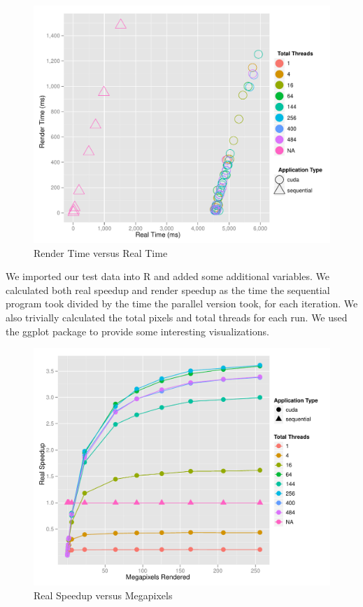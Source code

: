 \documentclass[12pt]{article}
\begin{document}
\begin{figure}
    \caption{Render Time versus Real Time} \label{fig:render_vs_real}
    \begin{center}
\includegraphics{cudatrace-003}
    \end{center}
\end{figure}

We imported our test data into R and added some additional variables. We calculated both real speedup and render speedup as the time the sequential program took divided by the time the parallel version took, for each iteration. We also trivially calculated the total pixels and total threads for each run. We used the ggplot package to provide some interesting visualizations.


\begin{figure}
    \caption{Real Speedup versus Megapixels} \label{fig:real_speedup}
    \begin{center}
\includegraphics{cudatrace-004}
    \end{center}
\end{figure}
\end{document}
